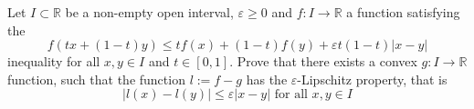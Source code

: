 Let $I\subset \mathbb R$ be a non-empty open interval, $\varepsilon\geq 0$ and $f\colon I\rightarrow\mathbb R$ a function satisfying the
$$f(tx+(1-t)y)\leq tf(x)+(1-t)f(y)+\varepsilon t(1-t)|x-y|$$inequality for all $x,y\in I$ and $t\in [0,1]$. Prove that there exists a convex $g\colon I\rightarrow\mathbb R$ function, such that the function $l :=f-g$ has the $\varepsilon$-Lipschitz property, that is
$$|l(x)-l(y)|\leq \varepsilon|x-y|\text{     for all }x,y\in I$$